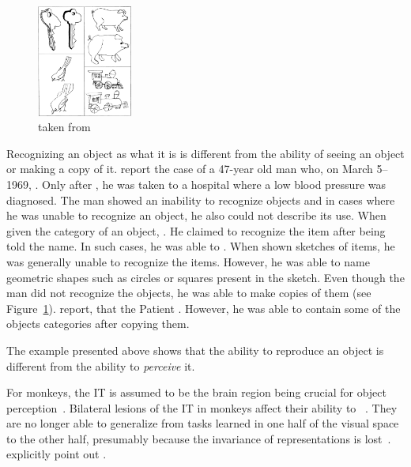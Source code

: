 \begin{figure}
    \begin{center}
        \includegraphics[width=0.28\textwidth]{images/rubens_sketches.jpg}
    \end{center}
    \caption[Copies of line drawings]{ taken from \citet{rubens1971associative}}
    \label{fig:copies_line_drawings}
\end{figure}
Recognizing an object as what it is is different from the ability of seeing an object or making a copy of it.
\citet{rubens1971associative} report the case of a 47-year old man who, on March 5--1969, .
Only after , he was taken to a hospital where a low blood pressure was diagnosed.
The man showed an inability to recognize objects and in cases where he was unable to recognize an object, he also could not describe its use.
When given the category of an object, .
He claimed to recognize the item after being told the name.
In such cases, he was able to .
When shown sketches of items, he was generally unable to recognize the items.
However, he was able to name geometric shapes such as circles or squares present in the sketch.
Even though the man did not recognize the objects, he was able to make copies of them (see Figure~\ref{fig:copies_line_drawings}).
\citet{rubens1971associative} report, that the Patient .
However, he was able to contain some of the objects categories after copying them.

The example presented above shows that the ability to reproduce an object is different from the ability to \textit{perceive} it.

For monkeys, the \ac{IT} is assumed to be the brain region being crucial for object perception~\citep[pp. 1070, 1071]{squire2012fundamental}.
Bilateral lesions of the \ac{IT} in monkeys affect their ability to ~\citep[p. 1070]{squire2012fundamental}.
They are no longer able to generalize from tasks learned in one half of the visual space to the other half, presumably because the invariance of representations is lost~\citep[p. 1070]{squire2012fundamental}.
\citet[p. 1071]{squire2012fundamental} explicitly point out .

